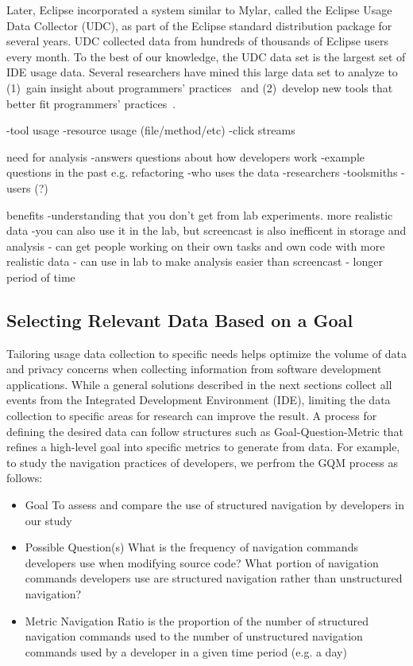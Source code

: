 Later, Eclipse incorporated a system similar to Mylar, called the Eclipse Usage
Data Collector (UDC), as part of the Eclipse standard
distribution package for several years. UDC collected data from hundreds of
thousands of Eclipse users every month. To the best of our knowledge, the UDC
data set is the largest set of IDE usage data.
Several researchers have mined this large data set to analyze to 
%
(1)~gain insight about programmers'
practices~\cite{VakilianJohnson2014Alternate, VakilianETAL2013Compositional,
V:MurphyHill2012How} and
%
(2)~develop new tools that better fit programmers'
practices~\cite{MurphyHill2012Improving, VakilianETAL2013Compositional}.


	-tool usage
	-resource usage (file/method/etc)
	-click streams

need for analysis
	-answers questions about how developers work
	-example questions in the past e.g. refactoring
	-who uses the data
		-researchers
		-toolsmiths
		-users (?)

benefits
	-understanding that you don't get from lab experiments. more realistic data
	-you can also use it in the lab, but screencast is also inefficent in storage and analysis
		- can get people working on their own tasks and own code with more realistic data
		- can use in lab to make analysis easier than screencast
		- longer period of time


\subsection{Selecting Relevant Data Based on a Goal}
	Tailoring usage data collection to specific needs helps optimize the volume of data and privacy concerns when collecting information from software development applications.  While a general solutions described in the next sections collect all events from the Integrated Development Environment (IDE), limiting the data collection to specific areas for research can improve the result.  A process for defining the desired data can follow structures such as Goal-Question-Metric \cite{basili-GQM}  that refines a high-level goal into specific metrics to generate from data.  For example, to study the navigation practices of developers, we perfrom the GQM process as follows:
    \begin{itemize}
\item
	Goal
\subitem
	To assess and compare the use of structured navigation by developers in our study
\item
	Possible Question(s)
\subitem
	What is the frequency  of navigation commands developers use when modifying source code?
\subitem
	What portion of navigation commands developers use are structured navigation rather than unstructured navigation?
\item
	Metric
\subitem
	Navigation Ratio is the proportion of the number of structured navigation commands used to the number of unstructured navigation commands used by a developer in a given time period (e.g. a day)

	    \end{itemize}

